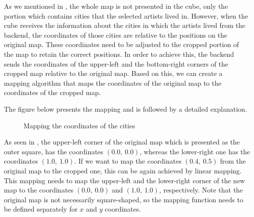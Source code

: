 As we mentioned in , the whole map is not presented in the cube, only the portion which contains cities that the
selected artists lived in. However, when the cube receives the information about the cities in which the artists lived from the backend,
the coordinates of those cities are relative to the positions on the original map. These coordinates need to be adjusted to the cropped portion of
the map to retain the correct positions. In order to achieve this, the backend sends the coordinates of the upper-left and the bottom-right corners
of the cropped map relative to the original map. Based on this, we can create a mapping algorithm that maps the coordinates of the original map to
the coordinates of the cropped map.

The figure below presents the mapping and is followed by a detailed explanation.

\begin{figure}[hbt!]
    \begin{center}
    \end{center}
    \caption{Mapping the coordinates of the cities}
    \label{fig:figure3.13}
\end{figure}

As seen in , the upper-left corner of the original map which is presented as the outer square, has the coordinates
$(0.0,\ 0.0)$, whereas the lower-right one has the coordinates $(1.0,\ 1.0)$. If we want to map the coordinates $(0.4,\ 0.5)$ from the original
map to the cropped one, this can be again achieved by linear mapping. This mapping needs to map the upper-left and the lower-right corner of the
new map to the coordinates $(0.0,\ 0.0)$ and $(1.0,\ 1.0)$, respectively. Note that the original map is not necessarily square-shaped, so the
mapping function needs to be defined separately for $x$ and $y$ coordinates.

